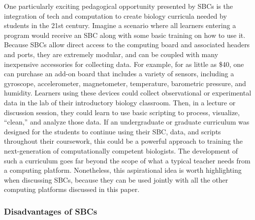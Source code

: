 One particularly exciting pedagogical opportunity presented by SBCs is
the integration of tech and computation to create biology curricula needed by
students in the 21st century.
Imagine a scenario where all learners entering a program would receive an SBC
along with some basic training on how to use it.
Because SBCs allow direct access to the computing board and
associated headers and ports, they are extremely modular, and can be coupled
with many inexpensive accessories for collecting data.
For example, for as little as \$40, one can purchase an add-on board that
includes a variety of sensors, including a gyroscope, accelerometer,
magnetometer, temperature, barometric pressure, and humidity.
Learners using these devices could collect observational or
experimental data in the lab of their introductory biology classroom.
Then, in a lecture or discussion session, they could learn to use basic
scripting to process, visualize, ``clean,'' and analyze those data.
If an undergraduate or graduate curriculum was designed for the students to
continue using their SBC, data, and scripts throughout their coursework, this
could be a powerful approach to training the next-generation of computationally
competent biologists.
The development of such a curriculum goes far beyond the scope of what a
typical teacher needs from a computing platform.
Nonetheless, this aspirational idea is worth highlighting when discussing
SBCs, because they can be used jointly with all the other computing platforms
discussed in this paper.


{}

\subsubsection{Disadvantages of SBCs}


